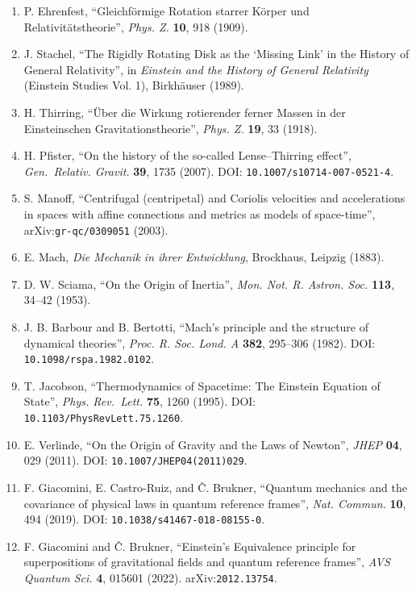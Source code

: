 \documentclass[
  a4paper,
]{ltjsarticle}
\providecommand{\tightlist}{%
  \setlength{\itemsep}{0pt}\setlength{\parskip}{0pt}}
\begin{document}
\begin{enumerate}
\def\labelenumi{\arabic{enumi}.}
\setcounter{enumi}{3}
\tightlist
\item
  P. Ehrenfest, ``Gleichförmige Rotation starrer Körper und
  Relativitätstheorie'', \emph{Phys. Z.} \textbf{10}, 918 (1909).
\item
  J. Stachel, ``The Rigidly Rotating Disk as the `Missing Link' in the
  History of General Relativity'', in \emph{Einstein and the History of
  General Relativity} (Einstein Studies Vol. 1), Birkhäuser (1989).
\item
  H. Thirring, ``Über die Wirkung rotierender ferner Massen in der
  Einsteinschen Gravitationstheorie'', \emph{Phys. Z.} \textbf{19}, 33
  (1918).
\item
  H. Pfister, ``On the history of the so-called Lense--Thirring
  effect'', \emph{Gen.~Relativ. Gravit.} \textbf{39}, 1735 (2007). DOI:
  \texttt{10.1007/s10714-007-0521-4}.
\item
  S. Manoff, ``Centrifugal (centripetal) and Coriolis velocities and
  accelerations in spaces with affine connections and metrics as models
  of space-time'', arXiv:\texttt{gr-qc/0309051} (2003).
\item
  E. Mach, \emph{Die Mechanik in ihrer Entwicklung}, Brockhaus, Leipzig
  (1883).
\item
  D. W. Sciama, ``On the Origin of Inertia'', \emph{Mon. Not. R. Astron.
  Soc.} \textbf{113}, 34--42 (1953).
\item
  J. B. Barbour and B. Bertotti, ``Mach's principle and the structure of
  dynamical theories'', \emph{Proc. R. Soc. Lond. A} \textbf{382},
  295--306 (1982). DOI: \texttt{10.1098/rspa.1982.0102}.
\item
  T. Jacobson, ``Thermodynamics of Spacetime: The Einstein Equation of
  State'', \emph{Phys. Rev.~Lett.} \textbf{75}, 1260 (1995). DOI:
  \texttt{10.1103/PhysRevLett.75.1260}.
\item
  E. Verlinde, ``On the Origin of Gravity and the Laws of Newton'',
  \emph{JHEP} \textbf{04}, 029 (2011). DOI:
  \texttt{10.1007/JHEP04(2011)029}.
\item
  F. Giacomini, E. Castro-Ruiz, and Č. Brukner, ``Quantum mechanics and
  the covariance of physical laws in quantum reference frames'',
  \emph{Nat. Commun.} \textbf{10}, 494 (2019). DOI:
  \texttt{10.1038/s41467-018-08155-0}.
\item
  F. Giacomini and Č. Brukner, ``Einstein's Equivalence principle for
  superpositions of gravitational fields and quantum reference frames'',
  \emph{AVS Quantum Sci.} \textbf{4}, 015601 (2022).
  arXiv:\texttt{2012.13754}.
\end{enumerate}
\end{document}

